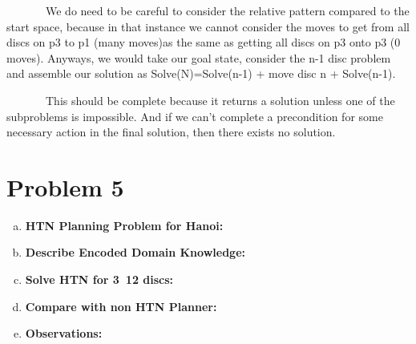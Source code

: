 \documentclass[]{article}
\begin{document}
\begin{enumerate}[(a)]
		~~~~~~~We do need to be careful to consider the relative pattern compared to the start space, because in that instance we cannot consider the moves to get from all discs on p3  to p1 (many moves)as the same as getting all discs on p3 onto p3 (0 moves). Anyways, we would take our goal state, consider the n-1 disc problem and assemble our solution as Solve(N)=Solve(n-1) + move disc n + Solve(n-1). 
		
		~~~~~~~This should be complete because it returns a solution unless one of the subproblems is impossible. And if we can't complete a precondition for some necessary action in the final solution, then there exists no solution.	
	\end{enumerate}
	
\section{Problem 5}
	\begin{enumerate}[(a)]
		\item \textbf{HTN Planning Problem for Hanoi:}\\
		\item \textbf{Describe Encoded Domain Knowledge:}\\
		\item \textbf{Solve HTN for 3~12 discs:}\\
		\item \textbf{Compare with non HTN Planner:}\\
		\item \textbf{Observations:}\\
	\end{enumerate}
\end{document}
